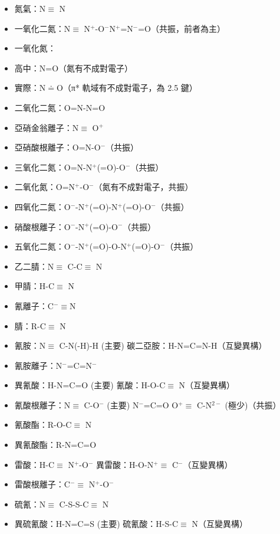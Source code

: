 \documentclass[a4paper,12pt]{report}
\begin{document}
\begin{itemize}
\item 氮氣：N$\equiv$ N
\item 一氧化二氮：N$\equiv$ N$^+$-O$^-$\ce{<=>}N$^+$=N$^-$=O（共振，前者為主）
\item 一氧化氮：
\bit
\item 高中：N=O（氮有不成對電子）
\item 實際：N$\doteq$O（π* 軌域有不成對電子，為 2.5 鍵）
\eit
\item 二氧化二氮：O=N-N=O
\item 亞硝金翁離子：N$\equiv$ O$^+$
\item 亞硝酸根離子：O=N-O$^-$（共振）
\item 三氧化二氮：O=N-N$^+$(=O)-O$^-$（共振）
\item 二氧化氮：O=N$^+$-O$^-$（氮有不成對電子，共振）
\item 四氧化二氮：O$^-$-N$^+$(=O)-N$^+$(=O)-O$^-$（共振）
\item 硝酸根離子：O$^-$-N$^+$(=O)-O$^-$（共振）
\item 五氧化二氮：O$^-$-N$^+$(=O)-O-N$^+$(=O)-O$^-$（共振）
\item 乙二腈：N$\equiv$ C-C$\equiv$ N
\item 甲腈：H-C$\equiv$ N
\item 氰離子：C$^-\equiv$N
\item 腈：R-C$\equiv$ N
\item 氰胺：N$\equiv$ C-N(-H)-H (主要) \ce{<=>} 碳二亞胺：H-N=C=N-H（互變異構）
\item 氰胺離子：N$^-$=C=N$^-$
\item 異氰酸：H-N=C=O (主要) \ce{<=>} 氰酸：H-O-C$\equiv$ N（互變異構）
\item 氰酸根離子：N$\equiv$ C-O$^-$ (主要) \ce{<=>} N$^-$=C=O \ce{<=>} O$^+\equiv$ C-N$^{2-}$ (極少)（共振）
\item 氰酸酯：R-O-C$\equiv$ N
\item 異氰酸酯：R-N=C=O
\item 雷酸：H-C$\equiv$ N$^+$-O$^-$ \ce{<=>} 異雷酸：H-O-N$^+\equiv$ C$^-$（互變異構）
\item 雷酸根離子：C$^-\equiv$ N$^+$-O$^-$
\item 硫氰：N$\equiv$ C-S-S-C$\equiv$ N
\item 異硫氰酸：H-N=C=S (主要) \ce{<=>} 硫氰酸：H-S-C$\equiv$ N（互變異構）

\end{itemize}
\end{document}
